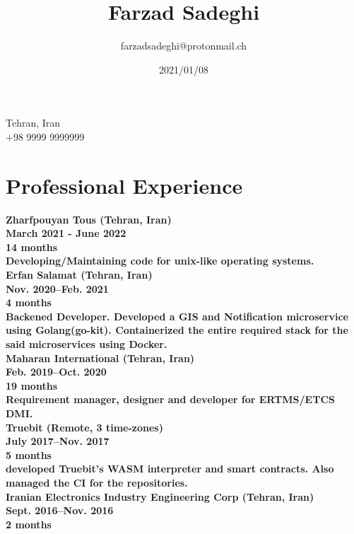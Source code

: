 \documentclass[8pt]{article}
\title{\bfseries Farzad Sadeghi}
\author{farzadsadeghi@protonmail.ch}
\date{2021/01/08}
\begin{document}
\begin{multicols}{2}
  \maketitle
  \begin{center}
    \begin{minipage}[ht]{0.2\textwidth}{\centering}
      \vspace*{\fill}
      \centering
      Tehran, Iran\\
      +98 9999 9999999
      \centering
      \vspace*{\fill}
    \end{minipage}
  \end{center}

  \section*{Professional Experience}
  \bf Zharfpouyan Tous (Tehran, Iran)\\
  March 2021 - June 2022\\
  14 months\\
  \normalfont Developing/Maintaining code for unix-like operating systems.\\[5pt]
  \bf Erfan Salamat (Tehran, Iran)\\
  Nov. 2020--Feb. 2021\\
  4 months\\
  \normalfont Backened Developer. Developed a GIS and Notification microservice using Golang(go-kit). Containerized the entire required stack for the said microservices using Docker.\\[5pt]
  \bf Maharan International (Tehran, Iran)\\
  Feb. 2019--Oct. 2020\\
  19 months\\
  \normalfont Requirement manager, designer and developer for ERTMS/ETCS DMI.\\[5pt]
  \bf Truebit (Remote, 3 time-zones)\\
  July 2017--Nov. 2017\\
  5 months\\
  \normalfont developed Truebit's WASM interpreter and smart contracts. Also managed the CI for the repositories.\\[5pt]
  \bf Iranian Electronics Industry Engineering Corp (Tehran, Iran)\\
  Sept. 2016--Nov. 2016\\
  2 months\\

\end{multicols}
\end{document}
